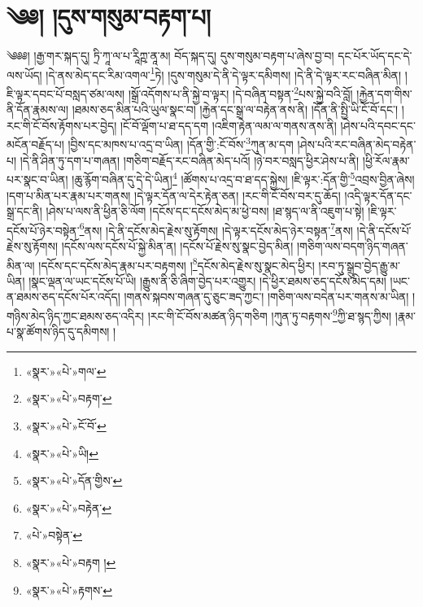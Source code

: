 \chapter{༄༅། །དུས་གསུམ་བརྟག་པ།}༄༅༅། །རྒྱ་གར་སྐད་དུ། ཏྲི་ཀཱ་ལ་པ་རཱིཀྵ་ནཱ་མ། བོད་སྐད་དུ། དུས་གསུམ་བརྟག་པ་ཞེས་བྱ་བ། དང་པོར་ཡོད་དང་དེ་ལས་ཡོད། །དེ་ནས་མེད་དང་རིམ་འགལ་\footnote{«སྣར་»«པེ་»གལ་}ཏེ། །དུས་གསུམ་དེ་ནི་དེ་ལྟར་དམིགས། །དེ་ནི་དེ་ལྟར་རང་བཞིན་མིན། །ཇི་ལྟར་དབང་པོ་བསླད་ཙམ་ལས། །སྒྲོ་འདོགས་པ་ནི་སྐྱེ་བ་ལྟར། །དེ་བཞིན་བསྟན་\footnote{«སྣར་»«པེ་»བརྟག་}པས་སྐྱེ་བའི་བློ། །རྐྱེན་དག་གིས་ནི་དོན་རྣམས་ལ། །ཐམས་ཅད་མིན་པའི་ཡུལ་སྣང་བ། །རྐྱེན་དང་སྒྲ་ལ་བརྟེན་ནས་ནི། །དོན་ནི་སྤྱི་ཡི་ངོ་བོ་དང་། །རང་གི་ངོ་བོས་རྟོགས་པར་བྱེད། །ངོ་བོ་ལྡོག་པ་ཐ་དད་དག །འཇིག་རྟེན་ལམ་ལ་གནས་ནས་ནི། །ཤེས་པའི་དབང་དང་མངོན་བརྗོད་པ། །བྱིས་དང་མཁས་པ་འདྲ་བ་ཡིན། །དོན་གྱི་:ངོ་བོས་\footnote{«སྣར་»«པེ་»ངོ་བོ་}ཀུན་མ་དག །ཤེས་པའི་རང་བཞིན་མེད་བརྟེན་པ། །དེ་ནི་ཤིན་ཏུ་དག་པ་གཞན། །གཅིག་བརྗོད་རང་བཞིན་མེད་པའོ། །ཉེ་བར་བསླད་ཕྱིར་ཤེས་པ་ནི། །ཕྱི་རོལ་རྣམ་པར་སྣང་བ་ཡིན། །ཆུ་རྙོག་བཞིན་དུ་དེ་དེ་ཡིན།\footnote{«སྣར་»«པེ་»ཡི།} །ཚོགས་པ་འདྲ་བ་ཐ་དད་སྐྱེས། །ཇི་ལྟར་:དོན་གྱི་\footnote{«སྣར་»«པེ་»དོན་གྱིས་}འབྲས་བྱིན་ཞེས། །དག་པ་མིན་པར་རྣམ་པར་གནས། །དེ་ལྟར་དོན་ལ་དེར་རྟེན་ཅན། །རང་གི་ངོ་བོས་བར་དུ་ཆོད། །འདི་ལྟར་དོན་དང་སྒྲ་དང་ནི། །ཤེས་པ་ལས་ནི་ཕྱིན་ཅི་ལོག །དངོས་དང་དངོས་མེད་མ་ཕྱེ་བས། །ཐ་སྙད་ལ་ནི་འཇུག་པ་སྟེ། །ཇི་ལྟར་དངོས་པོ་ཉེར་བསྟེན་\footnote{«སྣར་»«པེ་»བརྟེན་}ནས། །དེ་ནི་དངོས་མེད་རྗེས་སུ་རྟོགས། །དེ་ལྟར་དངོས་མེད་ཉེར་བསྟན་\footnote{«པེ་»བསྟེན་}ནས། །དེ་ནི་དངོས་པོ་རྗེས་སུ་རྟོགས། །དངོས་ལས་དངོས་པོ་སྐྱེ་མིན་ན། །དངོས་པོ་རྗེས་སུ་སྣང་བྱེད་མིན། །གཅིག་ལས་བདག་ཉིད་གཞན་མིན་ལ། །དངོས་དང་དངོས་མེད་རྣམ་པར་བརྟགས། །\footnote{«སྣར་»«པེ་»བརྟག །}དངོས་མེད་རྗེས་སུ་སྣང་མེད་ཕྱིར། །རབ་ཏུ་སྒྲུབ་བྱེད་རྒྱུ་མ་ཡིན། །སྣང་ལྡན་ལ་ཡང་དངོས་པོ་ཡི། །རྒྱུས་ནི་ཅི་ཞིག་བྱེད་པར་འགྱུར། །དེ་ཕྱིར་ཐམས་ཅད་དངོས་མེད་དམ། །ཡང་ན་ཐམས་ཅད་དངོས་པོར་འདོད། །གནས་སྐབས་གཞན་དུ་ཅུང་ཟད་ཀྱང་། །གཅིག་ལས་བདེན་པར་གནས་མ་ཡིན། །གཉིས་མེད་ཉིད་ཀྱང་ཐམས་ཅད་འདིར། །རང་གི་ངོ་བོས་མཚན་ཉིད་གཅིག །ཀུན་ཏུ་བརྟགས་\footnote{«སྣར་»«པེ་»རྟགས་}ཀྱི་ཐ་སྙད་ཀྱིས། །རྣམ་པ་སྣ་ཚོགས་ཉིད་དུ་དམིགས། །
